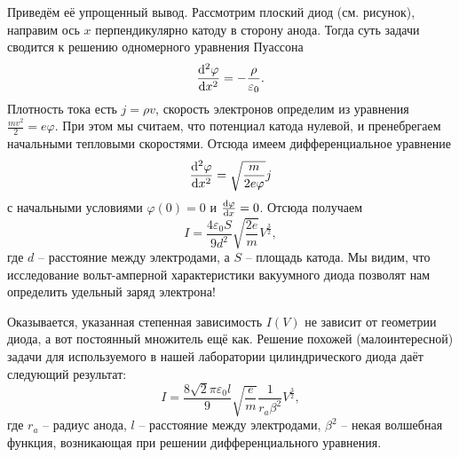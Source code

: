 \documentclass{lab_class}
\begin{document}
Приведём её упрощенный вывод. Рассмотрим плоский диод (см. рисунок), направим ось $x$ перпендикулярно катоду в сторону анода. Тогда суть задачи сводится к решению одномерного уравнения Пуассона
\begin{equation}
	\dv[2]{\varphi}{x} = - \frac{\rho}{\varepsilon_0}.
\end{equation}
Плотность тока есть $j = \rho v$, скорость электронов определим из уравнения $\frac{m v^2}{2} = e \varphi$. При этом мы считаем, что потенциал катода нулевой, и пренебрегаем начальными тепловыми скоростями. Отсюда имеем дифференциальное уравнение
\begin{equation*}
	\dv[2]{\varphi}{x} = \sqrt{\frac{m}{2e\varphi}} j
\end{equation*}
с начальными условиями $\varphi(0) = 0$ и $\dv{\varphi}{x} (0) = 0$. Отсюда получаем
\begin{equation}
	I = \frac{4 \varepsilon_0 S}{9 d^2} \sqrt{\frac{2e}{m}} V^{\frac{3}{2}},
\end{equation}
где $d$ -- расстояние между электродами, а $S$ -- площадь катода. Мы видим, что исследование вольт-амперной характеристики вакуумного диода позволят нам определить удельный заряд электрона!

Оказывается, указанная степенная зависимость $I(V)$ не зависит от геометрии диода, а вот постоянный множитель ещё как. Решение похожей (малоинтересной) задачи для используемого в нашей лаборатории цилиндрического диода даёт следующий результат:
\begin{equation}
	I = \frac{8\sqrt{2}\pi\varepsilon_0 l}{9} \sqrt{\frac{e}{m}} \frac{1}{r_a \beta^2} V^{\frac{3}{2}},
\end{equation}
где $r_a$ -- радиус анода, $l$ -- расстояние между электродами, $\beta^2$ -- некая волшебная функция, возникающая при решении дифференциального уравнения. 
\end{document}

